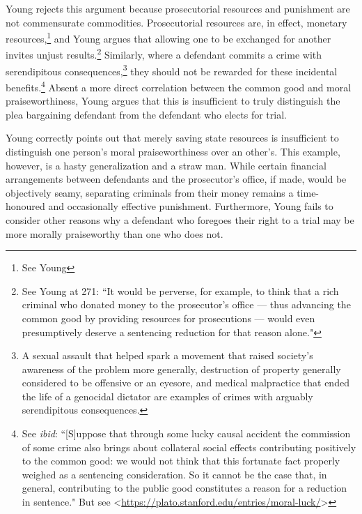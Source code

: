 Young rejects this argument because prosecutorial resources and punishment are not commensurate commodities. Prosecutorial resources are, in effect, monetary resources,\footnote{See Young} and Young argues that allowing one to be exchanged for another invites unjust results.\footnote{See Young at 271: ``It would be perverse, for example, to think that a rich criminal who donated money to the prosecutor's office — thus advancing the common good by providing resources for prosecutions — would even presumptively deserve a sentencing reduction for that reason alone."} Similarly, where a defendant commits a crime with serendipitous consequences,\footnote{A sexual assault that helped spark a movement that raised society's awareness of the problem more generally, destruction of property generally considered to be offensive or an eyesore, and medical malpractice that ended the life of a genocidal dictator are examples of crimes with arguably serendipitous consequences.} they should not be rewarded for these incidental benefits.\footnote{See \textit{ibid}: ``[S]uppose that through some lucky causal accident the commission of some crime also brings about collateral social effects contributing positively to the common good: we would not think that this fortunate fact properly weighed as a sentencing consideration. So it cannot be the case that, in general, contributing to the public good constitutes a reason for a reduction in sentence." But see \textless \url{https://plato.stanford.edu/entries/moral-luck/}\textgreater} Absent a more direct correlation between the common good and moral praiseworthiness, Young argues that this is insufficient to truly distinguish the plea bargaining defendant from the defendant who elects for trial.

Young correctly points out that merely saving state resources is insufficient to distinguish one person's moral praiseworthiness over an other's. This example, however, is a hasty generalization and a straw man. While certain financial arrangements between defendants and the prosecutor's office, if made, would be objectively seamy, separating criminals from their money remains a time-honoured and occasionally effective punishment. Furthermore, Young fails to consider other reasons why a defendant who foregoes their right to a trial may be more morally praiseworthy than one who does not.

